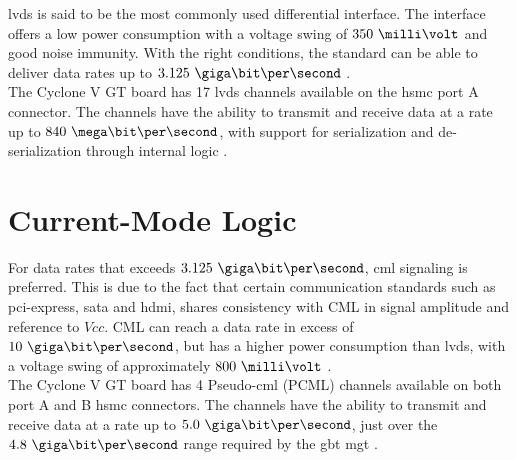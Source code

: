\documentclass[main.tex]{subfiles}
\begin{document}
\gls{lvds} is said to be the most commonly used differential interface. The interface offers a low power consumption with a voltage swing of $350\ \milli\volt$ and good noise immunity. With the right conditions, the standard can be able to deliver data rates up to $3.125\ \giga\bit\per\second$ \cite{ti08lvds}.\\

The Cyclone V GT board has 17 \gls{lvds} channels available on the \gls{hsmc} port A connector. The channels have the ability to transmit and receive data at a rate up to $840\ \mega\bit\per\second$, with support for serialization and de-serialization through internal logic \cite{altera_cvoverview15}.

\section{Current-Mode Logic}

For data rates that exceeds $3.125\ \giga\bit\per\second$, \gls{cml} signaling is preferred. This is due to the fact that certain communication standards such as \acrshort{pci}-express, \acrshort{sata} and \acrshort{hdmi}, shares consistency with CML in signal amplitude and reference to $Vcc$. CML can reach a data rate in excess of $10\ \giga\bit\per\second$, but has a higher power consumption than \gls{lvds}, with a voltage swing of approximately $800\ \milli\volt$ \cite{ti08lvds}.\\

The Cyclone V GT board has 4 Pseudo-\gls{cml} (PCML) channels available on both port A and B \gls{hsmc} connectors. The channels have the ability to transmit and receive data at a rate up to $5.0\ \giga\bit\per\second$, just over the $4.8\ \giga\bit\per\second$ range required by the \gls{gbt} \gls{mgt} \cite{altera_cyclonekit}.







\end{document}
